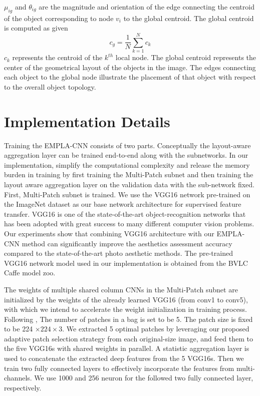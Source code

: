 \documentclass[10pt,twocolumn,letterpaper]{article}
\begin{document}
$\mu_{ig}$ and $\theta_{ig}$ are the magnitude and orientation of the edge connecting the centroid of the object corresponding to node $v_i$ to the global centroid. The global centroid is computed as given 
\[{c_g} = \frac{1}{N}\sum\limits_{k = 1}^N {{c_k}} \]
$c_k$ represents the centroid of the $k^{th}$ local node. The global centroid represents the center of the geometrical layout of the objects in the image. The edges connecting each object to the global node illustrate the placement of that object with respect to the overall object topology.

\section{Implementation Details}
Training the EMPLA-CNN consists of two parts. Conceptually the layout-aware aggregation layer can be trained end-to-end along with the subnetworks. In our implementation, simplify the computational complexity and release the memory burden in training by first training the Multi-Patch subnet and then training the layout aware aggregation layer on the validation data with the sub-network fixed.
First, Multi-Patch subnet is trained. 
We use the VGG16 network pre-trained on the ImageNet dataset as our base network architecture for supervised feature transfer. VGG16 is one of the state-of-the-art object-recognition networks that has been adopted with great success to many different computer vision problems. Our experiments show that combining VGG16 architecture with our EMPLA-CNN method can significantly improve the aesthetics assessment accuracy compared to the state-of-the-art photo aesthetic methods. The pre-trained VGG16 network model used in our implementation is obtained from the BVLC Caffe model zoo.
 
The weights of multiple shared column CNNs in the Multi-Patch subnet are initialized by the weights of the already learned VGG16 (from conv1 to conv5), with which we intend to accelerate the weight initialization in training process. Following \cite{Lu:2015:ICCV}, The number of patches in a bag is set to be 5. The patch size is fixed to be 224 $ \times 224 \times 3$. We extracted 5 optimal patches by leveraging our proposed adaptive patch selection strategy from each original-size image, and feed them to the five VGG16s with shared weights in parallel. A statistic aggregation layer is used to concatenate the extracted deep features from the 5 VGG16s. Then we train two fully connected layers to effectively incorporate the features from multi-channels. We use 1000 and 256 neuron for the followed two fully connected layer, respectively. 
\end{document}
